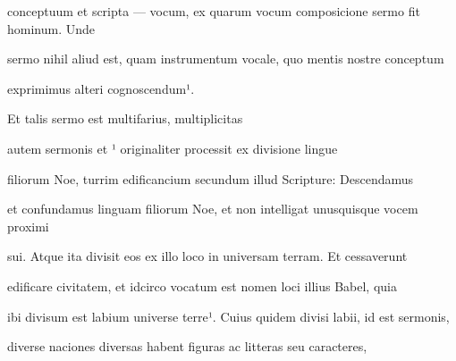 conceptuum et scripta — vocum, ex quarum vocum composicione sermo fit hominum. Unde

sermo nihil aliud est, quam instrumentum vocale, quo mentis nostre conceptum

\splitlines{}

exprimimus alteri cognoscendum¹.

\indentK  Et talis sermo est multifarius, multiplicitas

\fulllines{}
autem sermonis et ¹ originaliter processit ex divisione lingue

filiorum Noe, turrim edificancium secundum illud Scripture: Descendamus

et confundamus linguam filiorum Noe, et non intelligat unusquisque vocem proximi

sui. Atque ita divisit eos ex illo loco in universam terram. Et cessaverunt

edificare civitatem, et idcirco vocatum est nomen loci illius Babel, quia

ibi divisum est labium universe terre¹. Cuius quidem divisi labii, id est sermonis,

diverse naciones diversas habent figuras ac litteras seu caracteres,






